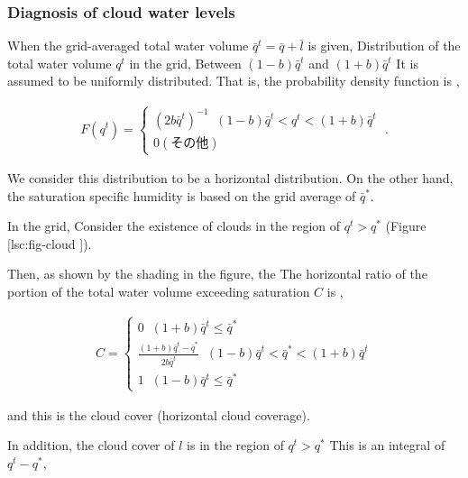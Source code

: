 \hypertarget{diagnosis-of-cloud-water-levels}{%
\subsubsection{Diagnosis of cloud water
levels}\label{diagnosis-of-cloud-water-levels}}

When the grid-averaged total water volume
\(\bar{q}^t = \bar{q} + \bar{l}\) is given, Distribution of the total
water volume \(q^t\) in the grid, Between \((1-b)\bar{q}^t\) and
\((1+b)\bar{q}^t\) It is assumed to be uniformly distributed. That is,
the probability density function is ,

\begin{eqnarray}
  F(q^t) = \left\{
           \begin{array}{ll}
             (2b\bar{q}^t)^{-1} \; \;
                 (1-b)\bar{q}^t < q^t <  (1+b)\bar{q}^t \\
             0                         (その他)
           \end{array}
           \right. \; .
\end{eqnarray}

We consider this distribution to be a horizontal distribution. On the
other hand, the saturation specific humidity is based on the grid
average of \(\bar{q}^*\).

In the grid, Consider the existence of clouds in the region of
\(q^t > q^*\) (Figure {[}lsc:fig-cloud
\protect\hyperlink{lsc:fig-cloud}{{]}}).

Then, as shown by the shading in the figure, the The horizontal ratio of
the portion of the total water volume exceeding saturation \(C\) is ,

\begin{eqnarray}
  C = \left\{
           \begin{array}{ll}
             0 \; \;  (1+b)\bar{q}^t \leq \bar{q}^* \\
             \displaystyle
             \frac{(1+b)\bar{q}^t - \bar{q}^*}
                  {2b\bar{q}^t}                    
               \; \;  (1-b)\bar{q}^t < \bar{q}^* < (1+b)\bar{q}^t \\
             1 \; \;  (1-b)\bar{q}^t \leq \bar{q}^*
           \end{array}
        \right.
\end{eqnarray}

and this is the cloud cover (horizontal cloud coverage).

In addition, the cloud cover of \(l\) is in the region of \(q^t > q^*\)
This is an integral of \(q^t - q^*\),

